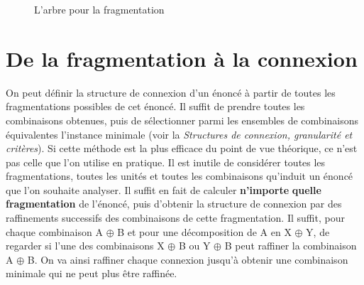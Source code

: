 \begin{figure}
\caption{\label{fig:}L’arbre pour la fragmentation }
\end{figure}

\section{De la fragmentation à la connexion}\label{sec:3.2.22}

On peut définir la structure de connexion d’un énoncé à partir de toutes les fragmentations possibles de cet énoncé. Il suffit de prendre toutes les combinaisons obtenues, puis de sélectionner parmi les ensembles de combinaisons équivalentes l’instance minimale (voir la  \textit{Structures de connexion, granularité et critères}). Si cette méthode est la plus efficace du point de vue théorique, ce n’est pas celle que l’on utilise en pratique. Il est inutile de considérer toutes les fragmentations, toutes les unités et toutes les combinaisons qu’induit un énoncé que l’on souhaite analyser. Il suffit en fait de calculer \textbf{n’importe} \textbf{quelle fragmentation} de l’énoncé, puis d’obtenir la structure de connexion par des raffinements successifs des combinaisons de cette fragmentation. Il suffit, pour chaque combinaison A ${\oplus}$ B et pour une décomposition de A en X ${\oplus}$ Y, de regarder si l’une des combinaisons X ${\oplus}$ B ou Y ${\oplus}$ B peut raffiner la combinaison A ${\oplus}$ B. On va ainsi raffiner chaque connexion jusqu’à obtenir une combinaison minimale qui ne peut plus être raffinée.

